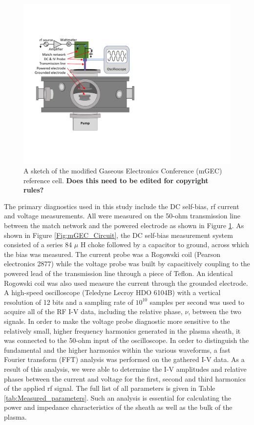 \documentclass[12pt]{iopart}
\begin{document}
\begin{figure}[ht!]
\begin{center}
\includegraphics[width=.89\textwidth]{mGEC.pdf}
	\caption{A sketch of the modified Gaseous Electronics Conference (mGEC) reference cell\cite{goeckner2004modified}.  \textbf{Does this need to be edited for copyright rules?}}
	\label{Fig:mGEC}
\end{center}
\end{figure}

The primary diagnostics used in this study include the DC self-bias, rf current and voltage measurements.  All were measured on the 50-ohm transmission line between the match network and the powered electrode as shown in Figure \ref{Fig:mGEC}. As shown in Figure \ref{Fig:mGEC_Circuit}, the DC self-bias measurement system consisted of a series 84 $\mu$ H choke followed by a capacitor to ground, across which the bias was measured.  The current probe was a Rogowski coil (Pearson electronics 2877) while the voltage probe was built by capacitively coupling to the powered lead of the transmission line through a piece of Teflon.  An identical Rogowski coil was also used measure the current through the grounded electrode. A high-speed oscilloscope (Teledyne Lecroy HDO 6104B) with a vertical resolution of 12 bits and a sampling rate of ${10}^{10}$ samples per second was used to acquire all of the RF I-V data, including the relative phase, $\nu$, between the two signals. In order to make the voltage probe diagnostic more sensitive to the relatively small, higher frequency harmonics generated in the plasma sheath, it was connected to the 50-ohm input of the oscilloscope.  In order to distinguish the fundamental and the higher harmonics within the various waveforms, a fast Fourier transform (FFT) analysis was performed on the gathered I-V data.  As a result of this analysis, we were able to determine the I-V amplitudes and relative phases between the current and voltage for the first, second and third harmonics of the applied rf signal.  The full list of all parameters is given in Table \ref{tab:Measured_parameters}.   Such an analysis is essential for calculating the power and impedance characteristics of the sheath as well as the bulk of the plasma.
\end{document}
